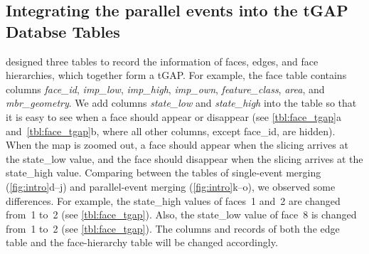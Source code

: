 \documentclass[ijgi,article,submit,moreauthors,pdftex]{Definitions/mdpi}
\begin{document}





\subsection{Integrating the parallel events into the tGAP Databse Tables}
\label{sec:integrate_tgap}

\citet[]{Meijers2011Thesis} designed three tables 
to record the information of
faces, edges, and face hierarchies, 
which together form a tGAP.
For example, the face table contains columns \emph{face\_id}, 
\emph{imp\_low}, \emph{imp\_high}, \emph{imp\_own},
\emph{feature\_class}, \emph{area}, and \emph{mbr\_geometry}.
We add columns \emph{state\_low} and \emph{state\_high} into the table 
so that it is easy to see when a face should appear or disappear 
(see \tbls\ref{tbl:face_tgap}a and~\ref{tbl:face_tgap}b,
where all other columns, except face\_id, are hidden).
When the map is zoomed out, a face should appear
when the slicing arrives at the state\_low value,
and the face should disappear
when the slicing arrives at the state\_high value.
Comparing between the tables of single-event merging 
(\figs\ref{fig:intro}d--j)
and parallel-event merging (\figs\ref{fig:intro}k--o),
we observed some differences.
For example, the state\_high values of faces~1 and~2 are changed from~1 to~2
(see \tbl\ref{tbl:face_tgap}).
Also, the state\_low value of face~8 is changed from~1 to~2
(see \tbl\ref{tbl:face_tgap}).
The columns and records of both the edge table and the face-hierarchy table 
will be changed accordingly.
\end{document}

